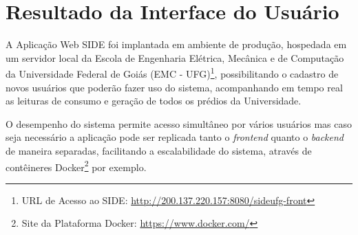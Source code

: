 \chapter {Resultado da Interface do Usuário}
\label{c:resultado_da_interface_do_usuario}

A Aplicação Web SIDE foi implantada em ambiente de produção, hospedada em um servidor local da Escola de Engenharia Elétrica, Mecânica e de Computação da Universidade Federal de Goiás (EMC - UFG)\footnote{URL de Acesso ao SIDE: \url{http://200.137.220.157:8080/sideufg-front}}, possibilitando o cadastro de novos usuários que poderão fazer uso do sistema, acompanhando em tempo real as leituras de consumo e geração de todos os prédios da Universidade.

O desempenho do sistema permite acesso simultâneo por vários usuários mas caso seja necessário a aplicação pode ser replicada tanto o \textit{frontend} quanto o \textit{backend} de maneira separadas, facilitando a escalabilidade do sistema, através de contêineres Docker\footnote{Site da Plataforma Docker: \url{https://www.docker.com/}} por exemplo.